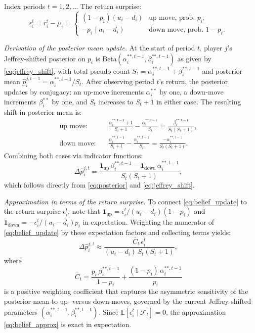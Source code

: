 \documentclass[12pt,a4paper]{article}
\newcommand{\E}{\mathbb{E}}
\newcommand{\1}{\mathbf{1}}
\begin{document}
Index periods $t = 1, 2, \ldots$ The return surprise:
\begin{equation}
  \epsilon_i^t = r_i^t - \mu_i
  = \begin{cases}
    (1-p_i)(u_i-d_i) & \text{up move, prob.\ }p_i,\\
    -p_i(u_i-d_i) & \text{down move, prob.\ }1-p_i.
  \end{cases}
  \label{eq:surprise}
\end{equation}

\textit{Derivation of the posterior mean update.}
At the start of period $t$, player $j$'s Jeffrey-shifted posterior
on $p_i$ is $\mathrm{Beta}(\alpha_i^{**,t-1}, \beta_i^{**,t-1})$
as given by \eqref{eq:jeffrey_shift}, with total pseudo-count
$S_t = \alpha_i^{**,t-1} + \beta_i^{**,t-1}$ and posterior mean
$\hat{p}_i^{j,t-1} = \alpha_i^{**,t-1}/S_t$.
After observing period $t$'s return, the posterior updates by
conjugacy: an up-move increments $\alpha_i^{**}$ by one, a
down-move increments $\beta_i^{**}$ by one, and $S_t$ increases
to $S_t + 1$ in either case. The resulting shift in posterior mean is:
\begin{align*}
  \text{up move:}\quad
  &\frac{\alpha_i^{**,t-1}+1}{S_t+1}
   - \frac{\alpha_i^{**,t-1}}{S_t}
   = \frac{\beta_i^{**,t-1}}{S_t(S_t+1)},\\[4pt]
  \text{down move:}\quad
  &\frac{\alpha_i^{**,t-1}}{S_t+1}
   - \frac{\alpha_i^{**,t-1}}{S_t}
   = \frac{-\alpha_i^{**,t-1}}{S_t(S_t+1)}.
\end{align*}
Combining both cases via indicator functions:
\begin{equation}
  \Delta\hat{p}_i^{j,t}
  = \frac{\1_{\mathrm{up}}\,\beta_i^{**,t-1}
         - \1_{\mathrm{down}}\,\alpha_i^{**,t-1}}
         {S_t(S_t+1)},
  \label{eq:belief_update}
\end{equation}
which follows directly from \eqref{eq:posterior} and
\eqref{eq:jeffrey_shift}.

\textit{Approximation in terms of the return surprise.}
To connect \eqref{eq:belief_update} to the return surprise
$\epsilon_i^t$, note that $\1_{\mathrm{up}} = \epsilon_i^t /
(u_i - d_i)(1-p_i)$ and $\1_{\mathrm{down}} = -\epsilon_i^t /
(u_i - d_i) p_i$ in expectation. Weighting the numerator of
\eqref{eq:belief_update} by these expectation factors and
collecting terms yields:
\begin{equation}
  \Delta\hat{p}_i^{j,t}
  \approx
  \frac{\bar{C}_t\,\epsilon_i^t}{(u_i-d_i)\,S_t(S_t+1)},
  \label{eq:belief_approx}
\end{equation}
where
\begin{equation}
  \bar{C}_t
  = \frac{p_i\,\beta_i^{**,t-1}}{1-p_i}
  + \frac{(1-p_i)\,\alpha_i^{**,t-1}}{p_i}
  \label{eq:Cbar}
\end{equation}
is a positive weighting coefficient that captures the asymmetric
sensitivity of the posterior mean to up- versus down-moves,
governed by the current Jeffrey-shifted parameters
$(\alpha_i^{**,t-1}, \beta_i^{**,t-1})$. Since
$\E[\epsilon_i^t \mid \mathcal{F}_t] = 0$, the approximation
\eqref{eq:belief_approx} is exact in expectation.
\end{document}
